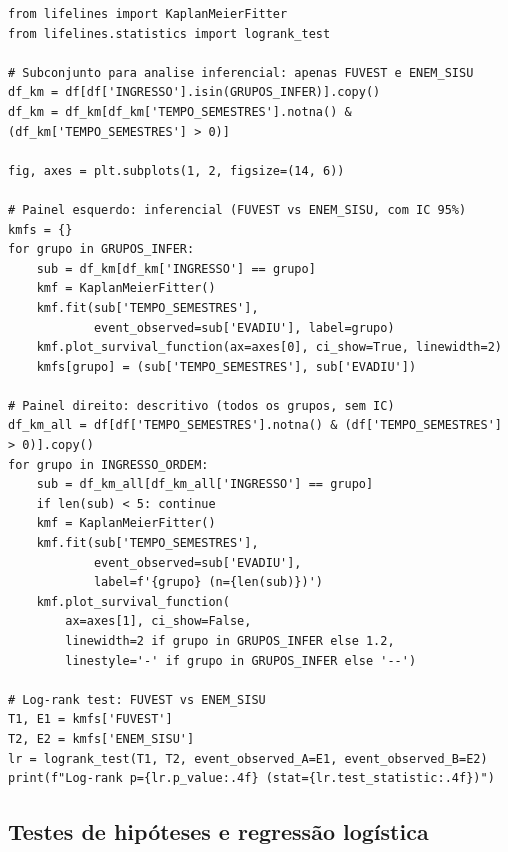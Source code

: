 \documentclass[12pt, a4paper]{article}
\begin{document}
\begin{lstlisting}[style=python, caption={Kaplan-Meier inferencial e descritivo}]
from lifelines import KaplanMeierFitter
from lifelines.statistics import logrank_test

# Subconjunto para analise inferencial: apenas FUVEST e ENEM_SISU
df_km = df[df['INGRESSO'].isin(GRUPOS_INFER)].copy()
df_km = df_km[df_km['TEMPO_SEMESTRES'].notna() & (df_km['TEMPO_SEMESTRES'] > 0)]

fig, axes = plt.subplots(1, 2, figsize=(14, 6))

# Painel esquerdo: inferencial (FUVEST vs ENEM_SISU, com IC 95%)
kmfs = {}
for grupo in GRUPOS_INFER:
    sub = df_km[df_km['INGRESSO'] == grupo]
    kmf = KaplanMeierFitter()
    kmf.fit(sub['TEMPO_SEMESTRES'],
            event_observed=sub['EVADIU'], label=grupo)
    kmf.plot_survival_function(ax=axes[0], ci_show=True, linewidth=2)
    kmfs[grupo] = (sub['TEMPO_SEMESTRES'], sub['EVADIU'])

# Painel direito: descritivo (todos os grupos, sem IC)
df_km_all = df[df['TEMPO_SEMESTRES'].notna() & (df['TEMPO_SEMESTRES'] > 0)].copy()
for grupo in INGRESSO_ORDEM:
    sub = df_km_all[df_km_all['INGRESSO'] == grupo]
    if len(sub) < 5: continue
    kmf = KaplanMeierFitter()
    kmf.fit(sub['TEMPO_SEMESTRES'],
            event_observed=sub['EVADIU'],
            label=f'{grupo} (n={len(sub)})')
    kmf.plot_survival_function(
        ax=axes[1], ci_show=False,
        linewidth=2 if grupo in GRUPOS_INFER else 1.2,
        linestyle='-' if grupo in GRUPOS_INFER else '--')

# Log-rank test: FUVEST vs ENEM_SISU
T1, E1 = kmfs['FUVEST']
T2, E2 = kmfs['ENEM_SISU']
lr = logrank_test(T1, T2, event_observed_A=E1, event_observed_B=E2)
print(f"Log-rank p={lr.p_value:.4f} (stat={lr.test_statistic:.4f})")
\end{lstlisting}

\subsection*{Testes de hipóteses e regressão logística}
\end{document}
